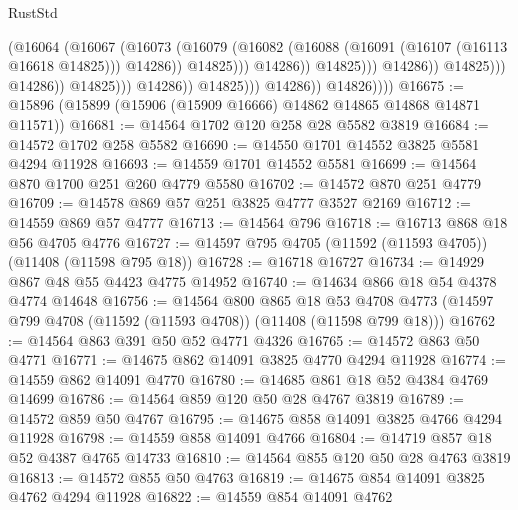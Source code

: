\begin{lexlean}{RustStd}
\begin{coremodule}
                                                      (@16064
                                                        (@16067
                                                          (@16073
                                                            (@16079
                                                              (@16082
                                                                (@16088
                                                                  (@16091
                                                                    (@16107 (@16113 @16618 @14825)))
                                                                  @14286))
                                                              @14825)))
                                                        @14286))
                                                    @14825)))
                                              @14286))
                                          @14825)))
                                    @14286))
                                @14825)))
                          @14286))
                      @14825)))
                @14286))
            @14826))))
@16675 := @15896 (@15899 (@15906 (@15909 @16666) @14862 @14865 @14868 @14871 @11571))
@16681 := @14564 @1702 @120 @258 @28 @5582 @3819
@16684 := @14572 @1702 @258 @5582
@16690 := @14550 @1701 @14552 @3825 @5581 @4294 @11928
@16693 := @14559 @1701 @14552 @5581
@16699 := @14564 @870 @1700 @251 @260 @4779 @5580
@16702 := @14572 @870 @251 @4779
@16709 := @14578 @869 @57 @251 @3825 @4777 @3527 @2169
@16712 := @14559 @869 @57 @4777
@16713 := @14564 @796
@16718 := @16713 @868 @18 @56 @4705 @4776
@16727 := @14597 @795 @4705 (@11592 (@11593 @4705)) (@11408 (@11598 @795 @18))
@16728 := @16718 @16727
@16734 := @14929 @867 @48 @55 @4423 @4775 @14952
@16740 := @14634 @866 @18 @54 @4378 @4774 @14648
@16756 := @14564
    @800
    @865
    @18
    @53
    @4708
    @4773
    (@14597 @799 @4708 (@11592 (@11593 @4708)) (@11408 (@11598 @799 @18)))
@16762 := @14564 @863 @391 @50 @52 @4771 @4326
@16765 := @14572 @863 @50 @4771
@16771 := @14675 @862 @14091 @3825 @4770 @4294 @11928
@16774 := @14559 @862 @14091 @4770
@16780 := @14685 @861 @18 @52 @4384 @4769 @14699
@16786 := @14564 @859 @120 @50 @28 @4767 @3819
@16789 := @14572 @859 @50 @4767
@16795 := @14675 @858 @14091 @3825 @4766 @4294 @11928
@16798 := @14559 @858 @14091 @4766
@16804 := @14719 @857 @18 @52 @4387 @4765 @14733
@16810 := @14564 @855 @120 @50 @28 @4763 @3819
@16813 := @14572 @855 @50 @4763
@16819 := @14675 @854 @14091 @3825 @4762 @4294 @11928
@16822 := @14559 @854 @14091 @4762

\end{coremodule}
\end{lexlean}
